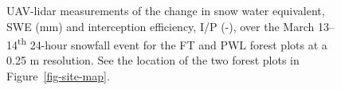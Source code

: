 \documentclass[
  letterpaper,
  DIV=11,
  numbers=noendperiod]{scrartcl}
\begin{document}
\begin{figure}[H]


\caption{\label{fig-lidar-tf-ip}UAV-lidar measurements of the change in
snow water equivalent, SWE (mm) and interception efficiency, I/P (-),
over the March 13--14\textsuperscript{th} 24-hour snowfall event for the
FT and PWL forest plots at a 0.25 m resolution. See the location of the
two forest plots in Figure~\ref{fig-site-map}.}

\end{figure}%
\end{document}
